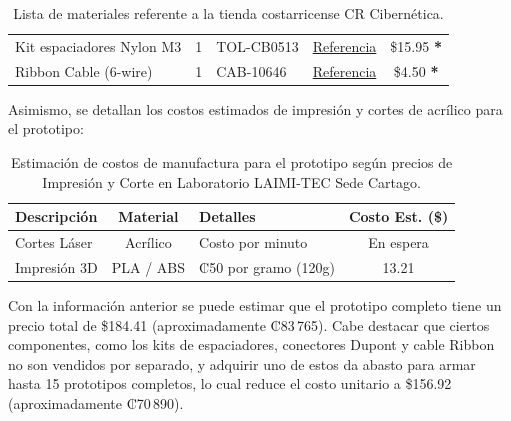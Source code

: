 \documentclass[12pt,a4paper]{article}
\begin{document}
\begin{table}[H]
\begin{threeparttable}
\begin{tabularx}{\textwidth}{@{} l c l X c @{}}
        Kit espaciadores Nylon M3 & 1 & TOL-CB0513 & \href{https://www.crcibernetica.com/m3-nylon-screw-black-hex-screw-nut-nylon-pcb-standoff-assortment-kit-250pcs/}{Referencia} & \$15.95 \textbf{*}\\
        Ribbon Cable (6-wire) & 1 & CAB-10646 & \href{https://www.crcibernetica.com/ribbon-cable-6-wire-15ft/}{Referencia} & \$4.50 \textbf{*} \\
        \bottomrule
    \end{tabularx}
    \begin{tablenotes}
        \footnotesize
        \item \textbf{*} son paquetes; con una unidad de cada producto se pueden armar 15 robots completos.} %
    \end{tablenotes}
    \end{threeparttable}
    \caption{Lista de materiales referente a la tienda costarricense CR Cibernética.}
\end{table}


Asimismo, se detallan los costos estimados de impresión y cortes de acrílico para el prototipo:

\begin{table}[H]
    \centering
    \renewcommand{\arraystretch}{1.2}
    \begin{tabularx}{\textwidth}{@{} l c X c @{}}
        \toprule
        \textbf{Descripción} & \textbf{Material} & \textbf{Detalles} & \textbf{Costo Est. (\$)} \\
        \midrule
        Cortes Láser & Acrílico & Costo por minuto & En espera \\
        Impresión 3D & PLA / ABS & ₡50 por gramo (120g) & 13.21 \\
        \bottomrule
    \end{tabularx}
    \caption{Estimación de costos de manufactura para el prototipo según precios de Impresión y Corte en Laboratorio LAIMI-TEC Sede Cartago.}
\end{table}

Con la información anterior se puede estimar que el prototipo completo tiene un precio total de \$184.41 (aproximadamente ₡83\,765). Cabe destacar que ciertos componentes, como los kits de espaciadores, conectores Dupont y cable Ribbon no son vendidos por separado, y adquirir uno de estos da abasto para armar hasta 15 prototipos completos, lo cual reduce el costo unitario a \$156.92 (aproximadamente ₡70\,890).
\end{document}
